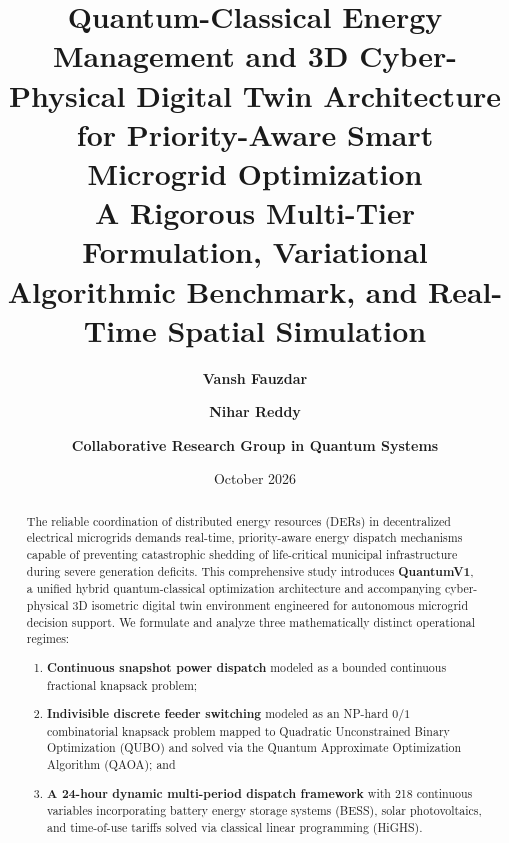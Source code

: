 \documentclass[11pt,a4paper]{article}
\title{\textbf{\LARGE Quantum-Classical Energy Management and 3D Cyber-Physical Digital Twin Architecture for Priority-Aware Smart Microgrid Optimization}\\[1ex]
\large A Rigorous Multi-Tier Formulation, Variational Algorithmic Benchmark, and Real-Time Spatial Simulation}
\author[1]{\textbf{Vansh Fauzdar}}
\author[2]{\textbf{Nihar Reddy}}
\author[1]{\textbf{Collaborative Research Group in Quantum Systems}}
\affil[1]{Department of Physics and Computational Sciences}
\affil[2]{Department of Electrical Engineering and Smart Grid Systems}
\date{October 2026}
\theoremstyle{definition}
\theoremstyle{remark}
\begin{document}
\maketitle

\begin{abstract}
\noindent The reliable coordination of distributed energy resources (DERs) in decentralized electrical microgrids demands real-time, priority-aware energy dispatch mechanisms capable of preventing catastrophic shedding of life-critical municipal infrastructure during severe generation deficits. This comprehensive study introduces \textbf{QuantumV1}, a unified hybrid quantum-classical optimization architecture and accompanying cyber-physical 3D isometric digital twin environment engineered for autonomous microgrid decision support. We formulate and analyze three mathematically distinct operational regimes: 
\begin{enumerate}
    \item \textbf{Continuous snapshot power dispatch} modeled as a bounded continuous fractional knapsack problem;
    \item \textbf{Indivisible discrete feeder switching} modeled as an NP-hard $0/1$ combinatorial knapsack problem mapped to Quadratic Unconstrained Binary Optimization (QUBO) and solved via the Quantum Approximate Optimization Algorithm (QAOA); and
    \item \textbf{A 24-hour dynamic multi-period dispatch framework} with 218 continuous variables incorporating battery energy storage systems (BESS), solar photovoltaics, and time-of-use tariffs solved via classical linear programming (HiGHS).
\end{enumerate}


\end{abstract}
\end{document}

